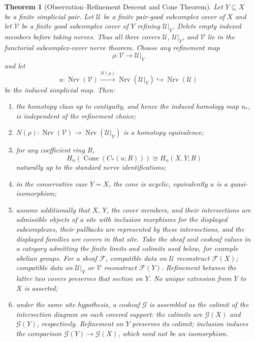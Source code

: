 \documentclass[11pt]{article}
\newtheorem{theorem}{Theorem}[section]
\newcommand{\Cone}{\operatorname{Cone}}
\newcommand{\Nrv}{\operatorname{Nrv}}
\begin{document}
\begin{theorem}[Observation--Refinement Descent and Cone Theorem]\label{thm:main}
Let $Y\subseteq X$ be a finite simplicial pair.  Let $\mathcal U$
be a finite pair-good subcomplex cover of $X$ and let $\mathcal V$ be
a finite good subcomplex cover of $Y$ refining $\mathcal U|_Y$.
Delete empty indexed members before taking nerves.  Thus all three covers
$\mathcal U$, $\mathcal U|_Y$, and $\mathcal V$ lie in the
functorial subcomplex-cover nerve theorem.  Choose any refinement map
\[
\rho:\mathcal V\longrightarrow\mathcal U|_Y
\]
and let
\[
u:
\Nrv(\mathcal V)\xrightarrow{N(\rho)}\Nrv(\mathcal U|_Y)
\hookrightarrow\Nrv(\mathcal U)
\]
be the induced simplicial map.  Then:
\begin{enumerate}[label=(\alph*)]
\item the homotopy class up to contiguity, and hence the induced homology map $u_*$, is independent of the refinement choice;
\item $N(\rho):\Nrv(\mathcal V)\to\Nrv(\mathcal U|_Y)$ is a homotopy equivalence;
\item for any coefficient ring $R$,
\[
H_n\!\left(\Cone(C_*(u;R))\right)
\cong H_n(X,Y;R)
\]
naturally up to the standard nerve identifications;
\item in the conservative case $Y=X$, the cone is acyclic, equivalently $u$ is a quasi-isomorphism;
\item assume additionally that $X$, $Y$, the cover members, and their
intersections are admissible objects of a site with inclusion
morphisms for the displayed subcomplexes, their pullbacks are represented
by these intersections, and the displayed families are covers in that
site.  Take the sheaf and cosheaf values in a category admitting the
finite limits and colimits used below, for example abelian groups.
For a sheaf $\mathcal F$, compatible data
on $\mathcal U$ reconstruct $\mathcal F(X)$; compatible data on
$\mathcal U|_Y$ or $\mathcal V$ reconstruct $\mathcal F(Y)$.
Refinement between the latter two covers preserves that section on $Y$.
No unique extension from $Y$ to $X$ is asserted;
\item under the same site hypothesis, a cosheaf $\mathcal G$ is assembled
as the colimit of the intersection diagram on each covered support: the
colimits are $\mathcal G(X)$ and $\mathcal G(Y)$, respectively.
Refinement on $Y$ preserves its colimit; inclusion induces the comparison
$\mathcal G(Y)\to\mathcal G(X)$, which need not be an isomorphism.
\end{enumerate}
\end{theorem}
\end{document}
